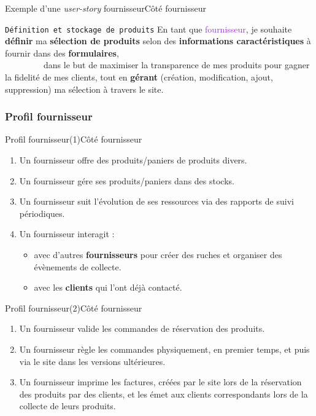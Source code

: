 \documentclass[usenames,dvipsnames]{beamer}
\begin{document}
\begin{frame}{Exemple d'une \textit{user-story} fournisseur}{Côté fournisseur}
\begin{block}{\textcolor{Sepia}{\texttt{Définition et stockage de produits}}}
En tant que \textcolor{DarkOrchid}{fournisseur}, je souhaite {\color{BrickRed} \textbf{définir} ma \textbf{sélection de produits} selon des \textbf{informations caractéristiques} à fournir dans des \textbf{formulaires}},\\
~~~~~~~~~dans le but de {\color{OliveGreen}maximiser la transparence de mes produits pour gagner la fidelité de mes clients, tout en \textbf{gérant} (création, modification, ajout, suppression) ma sélection à travers le site}.
\end{block}
\end{frame}

\subsubsection*{Profil fournisseur}
\begin{frame}{Profil fournisseur(1)}{Côté fournisseur}
\begin{enumerate}
  \item Un fournisseur offre des produits/paniers de produits divers.
  \item Un fournisseur gére ses produits/paniers dans des stocks.
  \item Un fournisseur suit l'évolution de ses ressources via des rapports de suivi périodiques.
  \item Un fournisseur interagit :
  \begin{itemize}
    \item avec d'autres \textbf{fournisseurs} pour créer des ruches et organiser des évènements de collecte.
    \item avec les \textbf{clients} qui l'ont déjà contacté.
  \end{itemize}
\end{enumerate}
\end{frame}

\begin{frame}{Profil fournisseur(2)}{Côté fournisseur}
\begin{enumerate}
  \item Un fournisseur valide les commandes de réservation des produits.
  \item Un fournisseur règle les commandes physiquement, en premier temps, et puis via le site dans les versions ultérieures.
  \item Un fournisseur imprime les factures, créées par le site lors de la réservation des produits par des clients, et les émet aux clients correspondants lors de la collecte de leurs produits.
\end{enumerate}
\end{frame}
\end{document}
